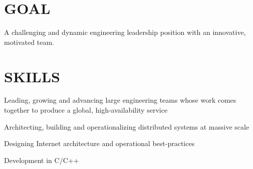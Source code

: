 \documentclass[margin]{res}
\begin{document}

\address{david.andrews112@gmail.com \ \ \ (949) 633-0588}

\begin{resume}

\section{GOAL}
\noindent
A challenging and dynamic engineering leadership position with an innovative, motivated team.


\section{SKILLS}
\noindent
\begin{list}{}{\leftmargin=0em \topsep=0pt \partopsep=0pt \parsep=2.5pt}
  \item Leading, growing and advancing large engineering teams whose work comes together to produce a global, high-availability service 
  \item Architecting, building and operationalizing distributed systems at massive scale
  \item Designing Internet architecture and operational best-practices
  \item Development in C/C++
\end{list}






\end{resume}
\end{document}
